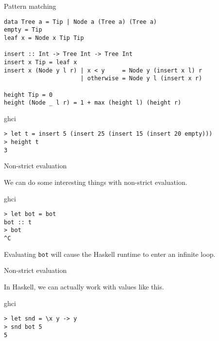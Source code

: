 %
\begin{frame}[fragile]{Pattern matching}

\begin{block}{}
\begin{verbatim}
data Tree a = Tip | Node a (Tree a) (Tree a)
empty = Tip
leaf x = Node x Tip Tip

insert :: Int -> Tree Int -> Tree Int
insert x Tip = leaf x
insert x (Node y l r) | x < y     = Node y (insert x l) r
                      | otherwise = Node y l (insert x r)

height Tip = 0
height (Node _ l r) = 1 + max (height l) (height r)
\end{verbatim}
\end{block}

\begin{block}{ghci}
\begin{verbatim}
> let t = insert 5 (insert 25 (insert 15 (insert 20 empty)))
> height t
3
\end{verbatim}
\end{block}

\end{frame}

%
\begin{frame}[fragile]{Non-strict evaluation}

We can do some interesting things with non-strict evaluation.

\begin{block}{ghci}
\begin{verbatim}
> let bot = bot
bot :: t
> bot
^C
\end{verbatim}
\end{block}

Evaluating \texttt{bot} will cause the Haskell runtime to enter an infinite
loop.

\end{frame}

%
\begin{frame}[fragile]{Non-strict evaluation}

In Haskell, we can actually work with values like this.

\begin{block}{ghci}
\begin{verbatim}
> let snd = \x y -> y
> snd bot 5
5
\end{verbatim}
\end{block}

\end{frame}

